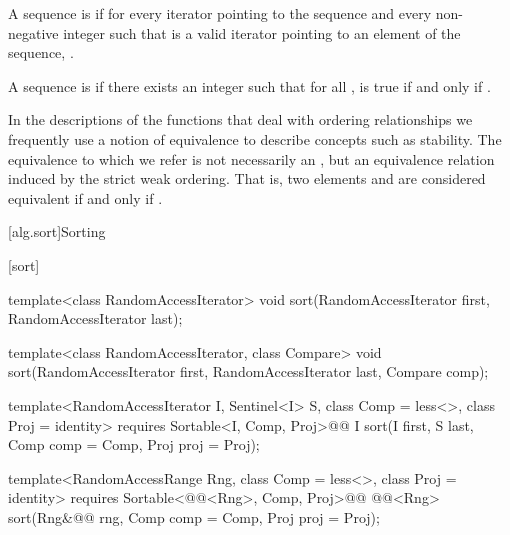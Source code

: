 \pnum
A sequence is
 if for every iterator
pointing to the sequence and every non-negative integer
such that
is a valid iterator pointing to an element of the sequence,
.

\pnum
A sequence
is
if there exists an integer
such that for all
,
is true if and only if
.

\pnum
In the descriptions of the functions that deal with ordering relationships we frequently use a notion of
equivalence to describe concepts such as stability.
The equivalence to which we refer is not necessarily an
,
but an equivalence relation induced by the strict weak ordering.
That is, two elements
and
are considered equivalent if and only if
.

[alg.sort]{Sorting}

[sort]{}

%
\begin{removedblock}
\begin{itemdecl}
template<class RandomAccessIterator>
  void sort(RandomAccessIterator first, RandomAccessIterator last);

template<class RandomAccessIterator, class Compare>
  void sort(RandomAccessIterator first, RandomAccessIterator last,
            Compare comp);
\end{itemdecl}
\end{removedblock}
\begin{addedblock}
\begin{itemdecl}
template<RandomAccessIterator I, Sentinel<I> S, class Comp = less<>,
    class Proj = identity>
  requires Sortable<I, Comp, Proj>@\newtxt{()}@
  I sort(I first, S last, Comp comp = Comp{}, Proj proj = Proj{});

template<RandomAccessRange Rng, class Comp = less<>, class Proj = identity>
  requires Sortable<@@<Rng>, Comp, Proj>@\newtxt{()}@
  @@<Rng>
    sort(Rng&@\newtxt{\&}@ rng, Comp comp = Comp{}, Proj proj = Proj{});
\end{itemdecl}
\end{addedblock}

